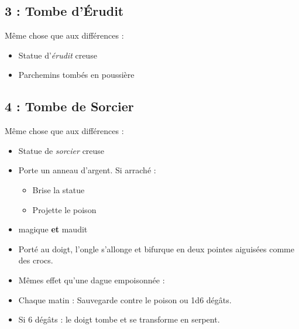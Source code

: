 \subsection{3 : Tombe d’Érudit}\label{n1:s3}
Même chose que \textbf{} aux différences :
\begin{itemize}
  \item Statue d'\emph{érudit} creuse
  \item Parchemins tombés en poussière
\end{itemize}

\subsection{4 : Tombe de Sorcier}\label{n1:s4}
Même chose que \textbf{} aux différences :
\begin{itemize}
  \item Statue de \emph{sorcier} creuse
  \item Porte un anneau d’argent. Si arraché :
  \begin{itemize}
    \item Brise la statue
    \item Projette le poison
  \end{itemize}
\end{itemize}

\begin{highlight}
  \begin{itemize}
    \item magique \textbf{et} maudit
    \item Porté au doigt, l’ongle s’allonge et bifurque en deux pointes aiguisées comme des crocs.
    \item Mêmes effet qu'une dague empoisonnée :
    \item Chaque matin  : Sauvegarde contre le poison ou 1d6 dégâts.
    \item Si 6 dégâts :  le doigt tombe et se transforme en serpent.
  \end{itemize}
\end{highlight}


